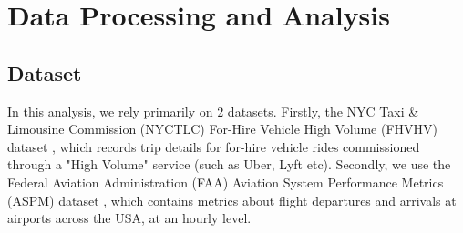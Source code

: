 \documentclass[11pt]{article}
\begin{document}


\section{Data Processing and Analysis}
\subsection{Dataset}
In this analysis, we rely primarily on 2 datasets. Firstly, the NYC Taxi \& Limousine Commission (NYCTLC) For-Hire Vehicle High Volume (FHVHV) dataset \cite{thebigtaxidataset}, which records trip details for for-hire vehicle rides commissioned through a "High Volume" service (such as Uber, Lyft etc). Secondly, we use the Federal Aviation Administration (FAA) Aviation System Performance Metrics (ASPM) dataset \cite{2021aspmflightdata}, which contains metrics about flight departures and arrivals at airports across the USA, at an hourly level.
\end{document}
